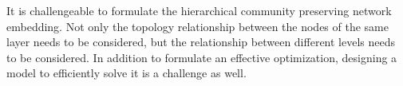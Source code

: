\documentclass{article}
\theoremstyle{definition}
\begin{document}
        


		It is challengeable to formulate the hierarchical community preserving network embedding. Not only the topology relationship between the nodes of the same layer needs to be considered, but the relationship between different levels needs to be considered. In addition to formulate an effective optimization, designing a model to efficiently solve it is a challenge as well. 
\end{document}

